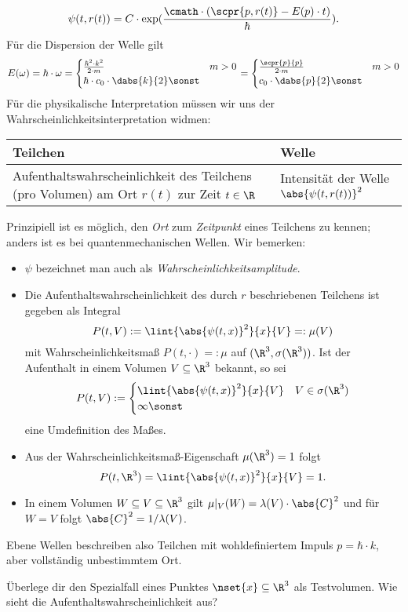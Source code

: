 \documentclass{article}
\begin{document}
        \[\psi(t,r(t)) = C\cdot\exp(\frac{\cmath\cdot (\scpr{p,r(t)}-E(p)\cdot t)}{\hbar}).\]
        Für die Dispersion der Welle gilt 
        \[E(\omega) = \hbar\cdot\omega = \begin{cases}
            \frac{\hbar^2\cdot k^2}{2\cdot m} & m>0 \\
            \hbar\cdot c_0\cdot \dabs{k}{2} \sonst
        \end{cases} = \begin{cases}
            \frac{\scpr{p}{p}}{2\cdot m} & m>0 \\
            c_0\cdot\dabs{p}{2} \sonst
        \end{cases}\]
        Für die physikalische Interpretation müssen wir uns der Wahrscheinlichkeitsinterpretation widmen: 
        \begin{table}[H]
            \centering
            \begin{tabular}{p{5cm}|p{5cm}}
                Teilchen & Welle \\
                \hline
                Aufenthaltswahrscheinlichkeit des Teilchens (pro Volumen) am Ort $r(t)$ zur Zeit $t\in\R$ & Intensität der Welle $\abs{\psi(t,r(t))}^2$ \\
            \end{tabular}
        \end{table}
        \noindent Prinzipiell ist es möglich, den \emph{Ort} zum \emph{Zeitpunkt} eines Teilchens zu kennen; anders ist es bei quantenmechanischen Wellen. Wir bemerken:
        \begin{itemize}[label=$\to$]
            \item $\psi$ bezeichnet man auch als \emph{Wahrscheinlichkeitsamplitude}. 
            \item Die Aufenthaltswahrscheinlichkeit des durch $r$ beschriebenen Teilchens ist gegeben als Integral 
            \[P(t,V) := \lint{\abs{\psi(t,x)}^2}{x}{V} =: \mu(V)\]
            mit Wahrscheinlichkeitsmaß $P(t,\cdot)=:\mu$ auf $(\R^3,\sigma(\R^3))$. Ist der Aufenthalt in einem Volumen $V\subseteq\R^3$ bekannt, so sei 
            \[P(t,V) := \begin{cases}
                \lint{\abs{\psi(t,x)}^2}{x}{V} & V\in\sigma(\R^3) \\
                \infty \sonst
            \end{cases}\]
            eine Umdefinition des Maßes. 
            \item Aus der Wahrscheinlichkeitsmaß-Eigenschaft $\mu(\R^3) = 1$ folgt
            \[P(t,\R^3) = \lint{\abs{\psi(t,x)}^2}{x}{V} = 1.\]
            \item In einem Volumen $W\subseteq V\subseteq\R^3$ gilt $\mu|_V(W) = \lambda(V)\cdot\abs{C}^2$ und für $W=V$ folgt $\abs{C}^2 = 1/\lambda(V)$.
        \end{itemize}
        Ebene Wellen beschreiben also Teilchen mit wohldefiniertem Impuls $p = \hbar\cdot k$, aber vollständig unbestimmtem Ort.
        \begin{Aufgabe}
            \nr{} Überlege dir den Spezialfall eines Punktes $\nset{x}\subseteq\R^3$ als Testvolumen. Wie sieht die Aufenthaltswahrscheinlichkeit aus?
        \end{Aufgabe}
\end{document}
